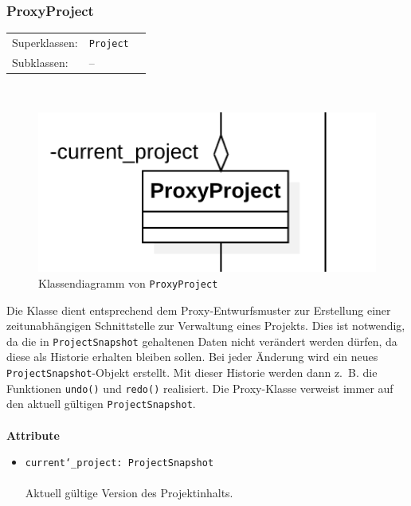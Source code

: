 \documentclass{article}
\begin{document}
\newpage
\subsubsection*{\large{\textbf{ProxyProject}\label{cls:ProxyProject}}}\normalsize
\begin{tabular}{lll}
 Superklassen: & \texttt{Project}\\
 Subklassen: & --
\end{tabular}\\
\begin{figure}[H]%
    \centering
    \includegraphics[width=13cm]{entwurf/Entwurf_dokument/img/cls/model/ProxyProject.png}
    \caption{Klassendiagramm von \texttt{ProxyProject}}
\end{figure}

Die Klasse dient entsprechend dem Proxy-Entwurfsmuster zur Erstellung einer zeitunabhängigen Schnittstelle zur Verwaltung eines Projekts. Dies ist notwendig, da die in \texttt{ProjectSnapshot} gehaltenen Daten nicht verändert werden dürfen, da diese als Historie erhalten bleiben sollen. Bei jeder Änderung wird ein neues \texttt{ProjectSnapshot}-Objekt erstellt. Mit dieser Historie werden dann z.~B. die Funktionen \texttt{undo()} und \texttt{redo()} realisiert. Die Proxy-Klasse verweist immer auf den aktuell gültigen \texttt{ProjectSnapshot}.
\\\\

\textbf{Attribute}
\begin{itemize}\setlength\itemsep{3em}
\item \texttt{current\char`_project: ProjectSnapshot}\\\\
Aktuell gültige Version des Projektinhalts.
\\\\
\end{itemize}
\end{document}
